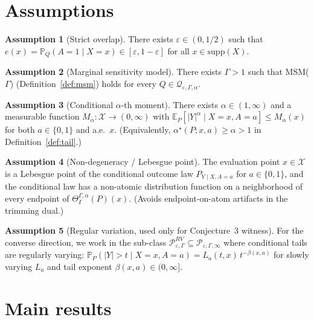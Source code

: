 \documentclass[11pt]{article}
\newcommand{\E}{\mathbb{E}}
\renewcommand{\Pr}{\mathbb{P}}
\theoremstyle{definition}
\newtheorem{assumption}{Assumption}
\theoremstyle{plain}
\theoremstyle{remark}
\begin{document}
\section{Assumptions}

\begin{assumption}[Strict overlap]\label{A1}
There exists $\varepsilon\in(0,1/2)$ such that $e(x)=\Pr_Q(A=1\mid X=x)\in[\varepsilon,1-\varepsilon]$ for all $x\in\mathrm{supp}(X)$.
\end{assumption}

\begin{assumption}[Marginal sensitivity model]\label{A2}
There exists $\Gamma>1$ such that MSM($\Gamma$) (Definition~\ref{def:msm}) holds for every $Q\in\mathcal{Q}_{\varepsilon,\Gamma,\alpha}$.
\end{assumption}

\begin{assumption}[Conditional $\alpha$-th moment]\label{A3}
There exists $\alpha\in(1,\infty)$ and a measurable function $M_{\alpha}:\mathcal{X}\to(0,\infty)$ with $\E_P[|Y|^{\alpha}\mid X=x,A=a]\le M_{\alpha}(x)$ for both $a\in\{0,1\}$ and a.e.\ $x$. (Equivalently, $\alpha^{\star}(P;x,a)\ge\alpha>1$ in Definition~\ref{def:tail}.)
\end{assumption}

\begin{assumption}[Non-degeneracy / Lebesgue point]\label{A4}
The evaluation point $x\in\mathcal{X}$ is a Lebesgue point of the conditional outcome law $P_{Y\mid X,A=a}$ for $a\in\{0,1\}$, and the conditional law has a non-atomic distribution function on a neighborhood of every endpoint of $\Theta_I^{\Gamma,\alpha}(P)(x)$. (Avoids endpoint-on-atom artifacts in the trimming dual.)
\end{assumption}

\begin{assumption}[Regular variation, used only for Conjecture~3 witness]\label{A5}
For the converse direction, we work in the sub-class $\mathcal{P}^{RV}_{\varepsilon,\Gamma}\subseteq\mathcal{P}_{\varepsilon,\Gamma,\infty}$ where conditional tails are regularly varying: $\Pr_P(|Y|>t\mid X=x,A=a)=L_a(t,x)\,t^{-\beta(x,a)}$ for slowly varying $L_a$ and tail exponent $\beta(x,a)\in(0,\infty]$.
\end{assumption}

\section{Main results}
\end{document}
